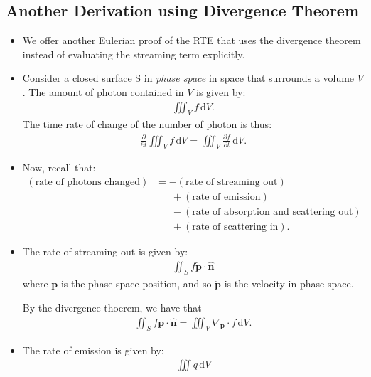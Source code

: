 \documentclass[10pt]{article}
\newcommand{\dee}{\mathrm{d}}
\newcommand{\ve}[1]{\mathbf{#1}}
\begin{document}
  \subsection{Another Derivation using Divergence Theorem}
  \begin{itemize}
    \item We offer another Eulerian proof of the RTE that uses the divergence theorem instead of evaluating the streaming term explicitly.

    \item Consider a closed surface S in \emph{phase space} in space that surrounds a volume $V$. The amount of photon contained in $V$ is given by:
    \begin{align*}
      \iiint_V f\, \dee V.
    \end{align*}
    The time rate of change of the number of photon is thus:
    \begin{align*}
      \frac{\partial}{\partial t} \iiint_V f\, \dee V = \iiint_V \frac{\partial f}{\partial t}\, \dee V.
    \end{align*}

    \item Now, recall that:
    \begin{align*}
      (\mbox{rate of photons changed}) 
      &= -(\mbox{rate of streaming out})\\
      &\phantom{\ =} + (\mbox{rate of emission})\\
      &\phantom{\ =} -(\mbox{rate of absorption and scattering out})\\
      &\phantom{\ =} + (\mbox{rate of scattering in}).
    \end{align*}

    \item The rate of streaming out is given by:
    \begin{align*}
      \iint_S f \dot{\ve{p}} \cdot \hat{\ve{n}}
    \end{align*}
    where $\ve{p}$ is the phase space position, and so $\dot{\ve{p}}$ is the velocity in phase space.

    By the divergence thoerem, we have that
    \begin{align*}
      \iint_S f \dot{\ve{p}} \cdot \hat{\ve{n}} = \iiint_V \nabla_{\ve{p}} \cdot f\, \dee V.
    \end{align*}

    \item The rate of emission is given by:
    \begin{align*}
      \iiint q\, \dee V
    \end{align*}


\end{itemize}
\end{document}
